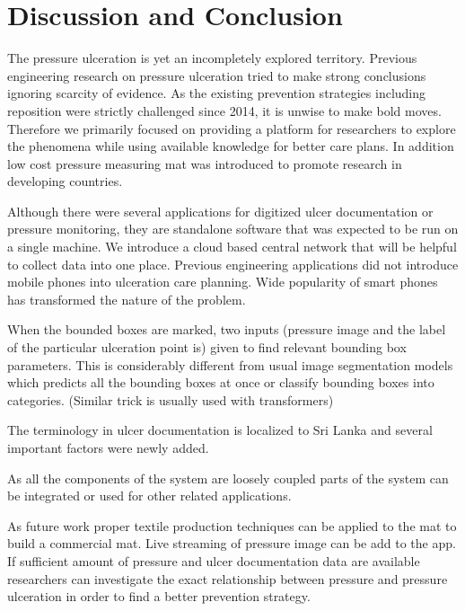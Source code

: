 \chapter{Discussion and Conclusion}

The pressure ulceration is yet an incompletely explored territory. Previous engineering research on pressure ulceration tried to make strong conclusions ignoring scarcity of evidence. As the existing prevention strategies including reposition were strictly challenged since 2014, it is unwise to make bold moves. Therefore we primarily focused on providing a platform for researchers to explore the phenomena while using available knowledge for better care plans. In addition low cost pressure measuring mat was introduced to promote research in developing countries. 

Although there were several applications for digitized ulcer documentation or pressure monitoring, they are standalone software that was expected to be run on a single machine. We introduce a cloud based central network that will be helpful to collect data into one place. Previous engineering applications did not introduce mobile phones into ulceration care planning. Wide popularity of smart phones has transformed the nature of the problem. 

When the bounded boxes are marked, two inputs (pressure image and the label of the particular ulceration point is) given to find relevant bounding box parameters. This is considerably different from usual image segmentation models which predicts all the bounding boxes at once or classify bounding boxes into categories. (Similar trick is usually used with transformers) 

The terminology in ulcer documentation is localized to Sri Lanka and several important factors were newly added.

As all the components of the system are loosely coupled parts of the system can be integrated or used for other related applications.

As future work proper textile production techniques can be applied to the mat to build a commercial mat. Live streaming of pressure image can be add to the app. If sufficient amount of pressure and ulcer documentation data are available researchers can investigate the exact relationship between pressure and pressure ulceration in order to find a better prevention strategy.


